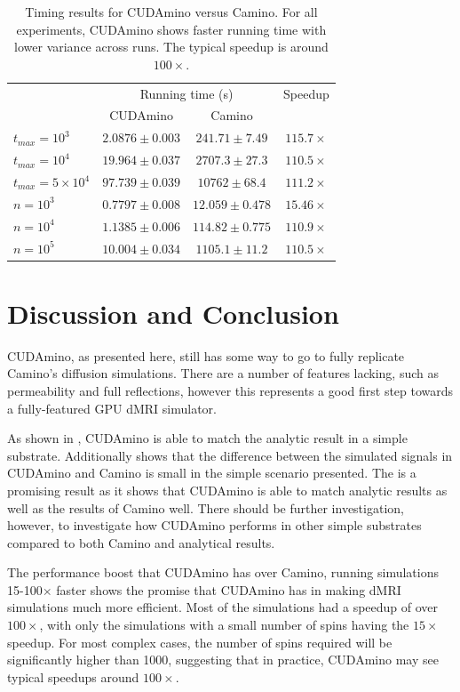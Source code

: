 \begin{table}
  \centering
  \begin{tabular}{lccc}
    \hline
    &\multicolumn{2}{c}{Running time (s)} & Speedup\\
    & CUDAmino & Camino \\\hline
     $t_{max}=10^3$ & $2.0876 \pm 0.003$ & $241.71 \pm 7.49$ & $115.7\times$\\
    $t_{max}=10^4$ & $19.964 \pm 0.037$ & $2707.3 \pm 27.3$ & $110.5\times$\\
    $t_{max}=5\times10^4$ & $97.739 \pm 0.039$ & $10762 \pm 68.4$ & $111.2\times$\\\rule{0pt}{3ex}
    $n=10^3$ & $0.7797 \pm 0.008$ & $12.059 \pm 0.478$ & $15.46\times$\\
    $n=10^4$ & $1.1385 \pm 0.006$ & $114.82 \pm 0.775$ & $110.9\times$\\
    $n=10^5$ & $10.004 \pm 0.034$ & $1105.1 \pm 11.2$ & $110.5\times$\\\hline
  \end{tabular}
  \caption{Timing results for CUDAmino versus Camino. For all experiments, CUDAmino shows faster running time with lower variance across runs. The typical speedup is around $100\times$.}
  \label{tab:cuboid_timing}
\end{table}

    

\section{Discussion and Conclusion}
\label{sec:cudamino_discussion}
CUDAmino, as presented here, still has some way to go to fully replicate Camino's diffusion simulations.
There are a number of features lacking, such as permeability and full reflections, however this represents a good first step towards a fully-featured GPU \ac{dMRI} simulator.

As shown in , CUDAmino is able to match the analytic result in a simple substrate. Additionally  shows that  the difference between the simulated signals in CUDAmino and Camino is small in the simple scenario presented.
The is a promising result as it shows that CUDAmino is able to match analytic results as well as the results of Camino well.
There should be further investigation, however, to investigate how CUDAmino performs in other simple substrates compared to both Camino and analytical results. 

The performance boost that CUDAmino has over Camino, running simulations 15-100$\times$ faster shows the promise that CUDAmino has in making \ac{dMRI} simulations much more efficient.
Most of the simulations had a speedup of over $100\times$, with only the simulations with a small number of spins having the $15\times$ speedup.
For most complex cases, the number of spins required will be significantly higher than 1000, suggesting that in practice, CUDAmino may see typical speedups around $100\times$.

